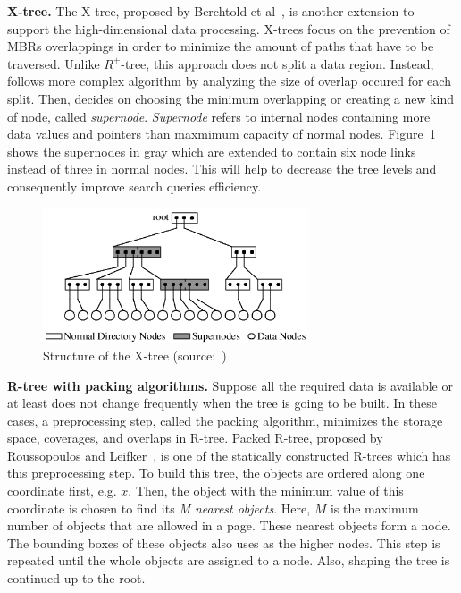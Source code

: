 \documentclass[a4paper,12pt]{article}
\begin{document}
\textbf{X-tree.}
The X-tree, proposed by Berchtold et al~\cite{xtree}, is another extension to support the high-dimensional data processing. X-trees focus on the prevention of MBRs overlappings in order to minimize the amount of paths that have to be traversed. Unlike $R^+$-tree, this approach does not split a data region. Instead, follows more complex algorithm by analyzing the size of overlap occured for each split. Then, decides on choosing the minimum overlapping or creating a new kind of node, called \textit{supernode}. \textit{Supernode} refers to internal nodes containing more data values and pointers than maxmimum capacity of normal nodes. Figure~\ref{figxtree} shows the supernodes in gray which are extended to contain six node links instead of three in normal nodes. This will help to decrease the tree levels and consequently improve search queries efficiency.

\begin{figure}
\centering
\includegraphics[width=0.7\textwidth]{xtree}
\caption{Structure of the X-tree (source:~\cite{xtree})}
\label{figxtree}
\end{figure}


\textbf{R-tree with packing algorithms.}
Suppose all the required data is available or at least does not change frequently when the tree is going to be built.
In these cases, a preprocessing step, called the packing algorithm, minimizes the storage space, coverages, and overlaps in R-tree.
Packed R-tree, proposed by Roussopoulos and Leifker~\cite{packedrtree, packedrtree2}, is one of the statically constructed R-trees which has this preprocessing step. To build this tree, the objects are ordered along one coordinate first, e.g. $x$. Then, the object with the minimum value of this coordinate is chosen to find its \textit{M nearest objects}. Here, $M$ is the maximum number of objects that are allowed in a page. These nearest objects form a node. The bounding boxes of these objects also uses as the higher nodes. This step is repeated until the whole objects are assigned to a node. Also, shaping the tree is continued up to the root.
\end{document}
